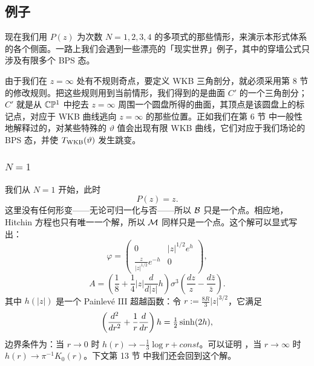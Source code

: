 
\subsection{例子}
\label{subsec:Examples}

现在我们用 $P(z)$ 为次数 $N=1,2,3,4$ 的多项式的那些情形，来演示本形式体系的各个侧面。一路上我们会遇到一些漂亮的「现实世界」例子，其中的穿墙公式只涉及有限多个 BPS 态。

由于我们在 $z=\infty$ 处有不规则奇点，要定义 WKB 三角剖分，就必须采用第 8 节%
的修改规则。把这些规则用到当前情形，我们得到的是曲面 $C'$ 的一个三角剖分；$C'$ 就是从 $\mathbb{C}\mathbb{P}^1$ 中挖去 $z=\infty$ 周围一个圆盘所得的曲面，其顶点是该圆盘上的标记点，对应于 WKB 曲线逃向 $z=\infty$ 的那些位置。正如我们在第 6 节%
中一般性地解释过的，对某些特殊的 $\vartheta$ 值会出现有限 WKB 曲线，它们对应于我们场论的 BPS 态，并使 $T_{\rm WKB}(\vartheta)$ 发生跳变。


\subsubsection{$N=1$}

我们从 $N=1$ 开始，此时
\begin{equation}
P(z) = z. \label{eq:N1-P}
\end{equation}
这里没有任何形变——无论可归一化与否——所以 $\mathcal{B}$ 只是一个点。相应地，Hitchin 方程也只有唯一一个解，所以 $\mathcal{M}$ 同样只是一个点。这个解可以显式写出：
\begin{equation}
\varphi = \begin{pmatrix} 0 &  \vert z \vert^{1/2} e^h \\
\frac{z}{\vert z \vert^{1/2}} e^{-h} & 0 \end{pmatrix}, \label{eq:ExactSol}
\end{equation}
\begin{equation}
A = \left( \frac{1}{8} + \frac{1}{4} \vert z\vert \frac{d}{d\vert
z\vert} h \right) \sigma^3 \left( \frac{dz}{z}- \frac{d\bar z}{\bar
z} \right). \label{eq:ExactSol-A}
\end{equation}
其中 $h(|z|)$ 是一个 Painlevé III 超越函数：令 $r := \frac{8 R}{3} \vert z\vert^{3/2}$，它满足
\begin{equation}
\left(\frac{d^2}{dr^2} + \frac{1}{r} \frac{d}{dr}\right)h = \tfrac{1}{2}
\sinh(2h), \label{eq:Painleve}
\end{equation}
边界条件为：当 $r\to 0$ 时 $h(r) \to - \frac{1}{3} \log r + const$。可以证明 \cite{McCoy:1976cd}，当 $r\to \infty$ 时 $h(r) \to \pi^{-1} K_0(r)$。下文第 13 节%
中我们还会回到这个解。

